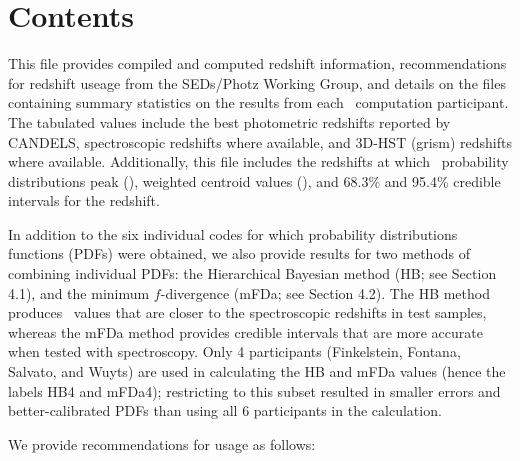 \section*{Contents}
This file provides compiled and computed redshift information, recommendations for redshift useage from the SEDs/Photz Working Group, and details on the files containing summary statistics on the results from each \photoz\ computation participant.  The tabulated values include the best photometric redshifts reported by CANDELS, spectroscopic redshifts where available, and 3D-HST (grism) redshifts where available. Additionally, this file includes the redshifts at which \photoz\ probability distributions peak (\zpeak), weighted centroid values (\zweight), and 68.3\% and 95.4\% credible intervals for the redshift.

In addition to the six individual codes for which probability distributions functions (PDFs) were obtained, we also provide results for two methods of combining individual PDFs: the Hierarchical Bayesian method (HB; see Section 4.1), and the minimum $f$-divergence (mFDa; see Section 4.2). The HB method produces \zweight\ values that are closer to the spectroscopic redshifts in test samples, whereas the mFDa method provides credible intervals that are more accurate when tested with spectroscopy.  Only 4 participants (Finkelstein, Fontana, Salvato, and Wuyts) are used in calculating the HB and mFDa values (hence the labels HB4 and mFDa4); restricting to this subset resulted in smaller errors and better-calibrated PDFs than using all 6 participants in the calculation.

We provide recommendations for usage as follows:

